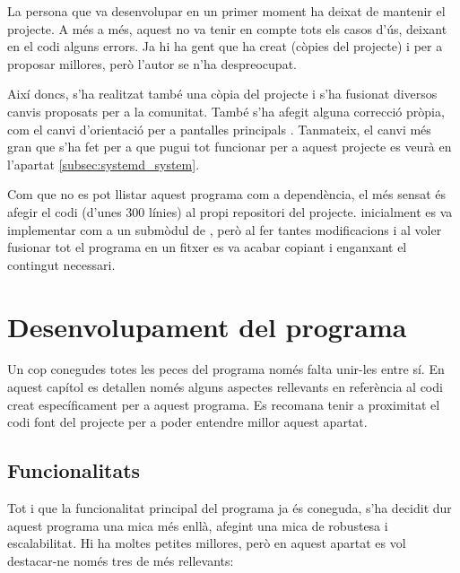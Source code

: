 La persona que va desenvolupar  en un primer moment ha deixat de
mantenir el projecte. A més a més, aquest no va tenir en compte tots els casos
d'ús, deixant en el codi alguns errors. Ja hi ha gent que ha creat 
(còpies del projecte) i  per a proposar millores, però
l'autor se n'ha despreocupat.

Així doncs, s'ha realitzat també una còpia del projecte i s'ha fusionat diversos
canvis proposats per a la comunitat. També s'ha afegit alguna correcció pròpia,
com el canvi d'orientació per a pantalles principals \cite{PyrandrOwn}. Tanmateix, el canvi més
gran que s'ha fet per a que pugui tot funcionar per a aquest projecte es veurà
en l'apartat \ref{subsec:systemd_system}.

Com que no es pot llistar aquest programa com a dependència, el més sensat és
afegir el codi (d'unes 300 línies) al propi repositori del projecte. inicialment
es va implementar com a un submòdul de , però al fer tantes
modificacions i al voler fusionar tot el programa en un fitxer es va acabar
copiant i enganxant el contingut necessari.

\section{Desenvolupament del programa}

Un cop conegudes totes les peces del programa només falta unir-les entre sí. En
aquest capítol es detallen només alguns aspectes rellevants en referència al codi
creat específicament per a aquest programa. Es recomana tenir a proximitat el
codi font del projecte per a poder entendre millor aquest apartat.

\subsection{Funcionalitats}

Tot i que la funcionalitat principal del programa ja és coneguda, s'ha decidit
dur aquest programa una mica més enllà, afegint una mica de robustesa i
escalabilitat. Hi ha moltes petites millores, però en aquest apartat es vol
destacar-ne només tres de més rellevants:

